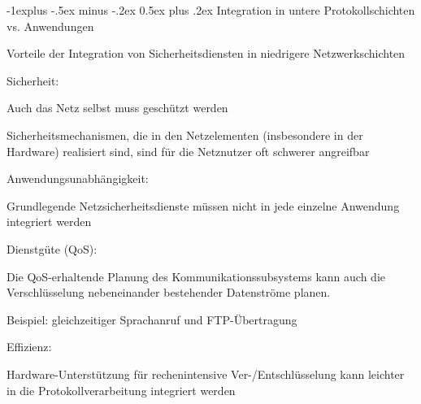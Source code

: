 \documentclass[a4paper]{article}
\makeatletter
\renewcommand{\subsection}{\@startsection{subsection}{2}{0mm}%
 {-1explus -.5ex minus -.2ex}%
 {0.5ex plus .2ex}%
 {\normalfont\normalsize\bfseries}}
\makeatother
\begin{document}
\begin{multicols}{3}
      \subsection{Integration in untere Protokollschichten vs. Anwendungen}
      \begin{itemize*}
            \item Vorteile der Integration von Sicherheitsdiensten in niedrigere Netzwerkschichten
            \item Sicherheit:
            \begin{itemize*}
                  \item Auch das Netz selbst muss geschützt werden
                  \item Sicherheitsmechanismen, die in den Netzelementen (insbesondere in der Hardware) realisiert sind, sind für die Netznutzer oft schwerer angreifbar
            \end{itemize*}
            \item Anwendungsunabhängigkeit:
            \begin{itemize*}
                  \item Grundlegende Netzsicherheitsdienste müssen nicht in jede einzelne Anwendung integriert werden
            \end{itemize*}
            \item Dienstgüte (QoS):
            \begin{itemize*}
                  \item Die QoS-erhaltende Planung des Kommunikationssubsystems kann auch die Verschlüsselung nebeneinander bestehender Datenströme planen.
                  \item Beispiel: gleichzeitiger Sprachanruf und FTP-Übertragung
            \end{itemize*}
            \item Effizienz:
            \begin{itemize*}
                  \item Hardware-Unterstützung für rechenintensive Ver-/Entschlüsselung kann leichter in die Protokollverarbeitung integriert werden
            \end{itemize*}
      \end{itemize*}


\end{multicols}
\end{document}
